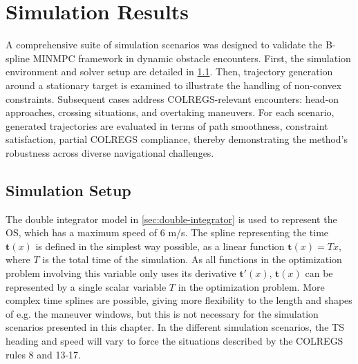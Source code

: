 
\chapter{Simulation Results}\label{chap:simulation-results}

A comprehensive suite of simulation scenarios was designed to validate the B-spline MINMPC framework in dynamic obstacle encounters. First, the simulation environment and solver setup are detailed in \cref{sec:simulation-setup}. Then, trajectory generation around a stationary target is examined to illustrate the handling of non-convex constraints. Subsequent cases address COLREGS-relevant encounters: head-on approaches, crossing situations, and overtaking maneuvers. For each scenario, generated trajectories are evaluated in terms of path smoothness, constraint satisfaction, partial COLREGS compliance, thereby demonstrating the method’s robustness across diverse navigational challenges.


\section{Simulation Setup}\label{sec:simulation-setup}

The double integrator model in \cref{sec:double-integrator} is used to represent the OS, which has a maximum speed of 6 m/s. The spline representing the time $\mathbf t(x)$ is defined in the simplest way possible, as a linear function $\mathbf t(x) = Tx$, where $T$ is the total time of the simulation. As all functions in the optimization problem involving this variable only uses its derivative $\mathbf t'(x)$, $\mathbf t(x)$ can be represented by a single scalar variable $T$ in the optimization problem. 
More complex time splines are possible, giving more flexibility to the length and shapes of e.g. the maneuver windows, but this is not necessary for the simulation scenarios presented in this chapter.
In the different simulation scenarios, the TS heading and speed will vary to force the situations described by the COLREGS rules 8 and 13-17.

